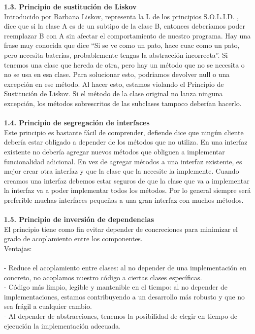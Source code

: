 \documentclass[11pt,letterpaper]{article}
\begin{document}
\textbf{ 1.3. Principio de sustitución de Liskov}
\\Introducido por Barbana Liskov, representa la L de los principios S.O.L.I.D. , dice que si la clase A es de un subtipo de la clase B, entonces deberíamos poder reemplazar B con A sin afectar el comportamiento de nuestro programa.
Hay una frase muy conocida que dice “Si se ve como un pato, hace cuac como un pato, pero necesita baterías, probablemente tengas la abstracción incorrecta”.
Si tenemos una clase que hereda de otra, pero hay un método que no se necesita o no se usa en esa clase. Para solucionar esto, podriamos devolver null o una excepción en ese método. Al hacer esto, estamos violando el Principio de Sustitución de Liskov. Si el método de la clase original no lanza ninguna excepción, los métodos sobrescritos de las subclases tampoco deberían hacerlo.
\\ \\ 
\textbf{ 1.4. Principio de segregación de interfaces}
\\Este principio es bastante fácil de comprender, defiende dice que ningún cliente debería estar obligado a depender de los métodos que no utiliza.
En una interfaz existente no debería agregar nuevos métodos que obliguen a implementar funcionalidad adicional. En vez de agregar métodos a una interfaz existente, es mejor crear otra interfaz y que la clase que la necesite la implemente.
Cuando creamos una interfaz debemos estar seguros de que la clase que va a implementar la interfaz va a poder implementar todos los métodos.
Por lo general siempre será preferible muchas interfaces pequeñas a una gran interfaz con muchos métodos.
\\ \\ 
\textbf{ 1.5. Principio de inversión de dependencias}
\\El principio tiene como fin evitar depender de concreciones para minimizar el grado de acoplamiento entre los componentes.\\
Ventajas:\\\\
- Reduce el acoplamiento entre clases: al no depender de una implementación en concreto, no acoplamos nuestro código a ciertas clases específicas.\\
- Código más limpio, legible y mantenible en el tiempo: al no depender de implementaciones, estamos contribuyendo a un desarrollo más robusto y que no sea frágil a cualquier cambio.\\
- Al depender de abstracciones, tenemos la posibilidad de elegir en tiempo de ejecución la implementación adecuada.
\\ \\ 
\end{document}
